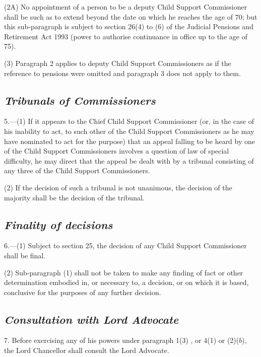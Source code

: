 \documentclass[12pt,a4paper]{article}
\begin{document}
(2A) No appointment of a person to be a deputy Child Support Commissioner shall be such as to extend beyond the date on which he reaches the age of 70; but this sub-paragraph is subject to section 26(4) to (6) of the Judicial Pensions and Retirement Act 1993 (power to authorise continuance in office up to the age of 75).

(3) Paragraph 2 applies to deputy Child Support Commissioners as if the reference to pensions were omitted and paragraph 3 does not apply to them.


\subsection*{\itshape Tribunals of Commissioners}

5.---(1) If it appears to the Chief Child Support Commissioner (or, in the case of his inability to act, to such other of the Child Support Commissioners as he may have nominated to act for the purpose) that an appeal falling to be heard by one of the Child Support Commissioners involves a question of law of special difficulty, he may direct that the appeal be dealt with by a tribunal consisting of any three of the Child Support Commissioners.

(2) If the decision of such a tribunal is not unanimous, the decision of the majority shall be the decision of the tribunal.

\subsection*{\itshape Finality of decisions}

6.---(1) Subject to section 25, the decision of any Child Support Commissioner shall be final.

(2) Sub-paragraph (1)  shall not be taken to make any finding of fact or other determination embodied in, or necessary to, a decision, or on which it is based, conclusive for the purposes of any further decision.

\subsection*{\itshape Consultation with Lord Advocate}

7. Before exercising any of his powers under 
paragraph 1(3)%
, or 4(1)  or (2)($b$), the Lord Chancellor shall consult the Lord Advocate.
\end{document}
